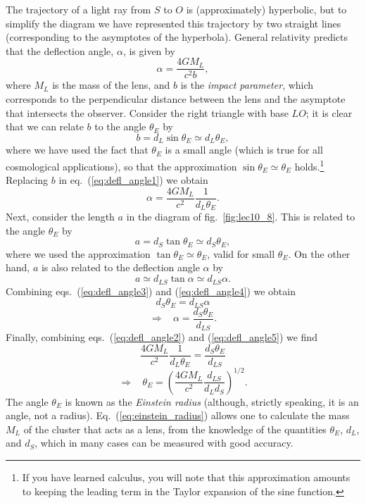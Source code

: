 The trajectory of a light ray from $S$ to $O$ is (approximately) hyperbolic, but to simplify the diagram we have represented this trajectory by two straight lines (corresponding to the asymptotes of the hyperbola). General relativity predicts that the deflection angle, $\alpha$, is given by
\begin{equation} \label{eq:defl_angle1}
\alpha= \frac{4GM_L}{c^2 b},
\end{equation}
where $M_L$ is the mass of the lens, and $b$ is the {\it impact parameter}, which corresponds to the perpendicular distance between the lens and the asymptote that intersects the observer. Consider the right triangle with base $LO$; it is clear that we can relate $b$ to the angle $\theta_E$ by
\begin{equation}
b=d_L \sin\theta_E \simeq d_L \theta_E,
\end{equation}
where we have used the fact that $\theta_E$ is a small angle (which is true for all cosmological applications), so that the approximation $\sin\theta_E \simeq\theta_E$ holds.\footnote{If you have learned calculus, you will note that this approximation amounts to keeping the leading term in the Taylor expansion of the sine function.} Replacing $b$ in eq.\ (\ref{eq:defl_angle1}) we obtain
\begin{equation} \label{eq:defl_angle2}
\alpha= \frac{4GM_L}{c^2}\frac{1}{d_L \theta_E}.
\end{equation}
Next, consider the length $a$ in the diagram of fig.\ \ref{fig:lec10_8}. This is related to the angle $\theta_E$ by
\begin{equation} \label{eq:defl_angle3}
a=d_S \tan \theta_E \simeq d_S \theta_E,
\end{equation}
where we used the approximation $\tan\theta_E\simeq \theta_E$, valid for small $\theta_E$. On the other hand, $a$ is also related to the deflection angle $\alpha$ by
\begin{equation} \label{eq:defl_angle4}
a\simeq d_{LS} \tan\alpha \simeq d_{LS}\alpha.
\end{equation}
Combining eqs.\ (\ref{eq:defl_angle3}) and (\ref{eq:defl_angle4}) we obtain
\begin{equation}
d_S\theta_E = d_{LS}\alpha
\end{equation}
\begin{equation} \label{eq:defl_angle5}
\Rightarrow~~~~ \alpha = \frac{d_S\theta_E}{d_{LS}}.
\end{equation}
Finally, combining eqs.\ (\ref{eq:defl_angle2}) and (\ref{eq:defl_angle5}) we find
\begin{equation}
\frac{4GM_L}{c^2}\frac{1}{d_L \theta_E} = \frac{d_S\theta_E}{d_{LS}}
\end{equation}
\begin{equation} \label{eq:einstein_radius}
\Rightarrow~~~~\theta_E=\left( \frac{4GM_L}{c^2}\frac{d_{LS}}{d_L d_S} \right)^{1/2}.
\end{equation}
The angle $\theta_E$ is known as the {\it Einstein radius} (although, strictly speaking, it is an angle, not a radius). Eq.\ (\ref{eq:einstein_radius}) allows one to calculate the mass $M_L$ of the cluster that acts as a lens, from the knowledge of the quantities $\theta_E$, $d_L$, and $d_S$, which in many cases can be measured with good accuracy.

